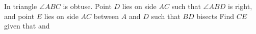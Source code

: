 In triangle  $\angle ABC$ is obtuse.  Point $D$ lies on side $AC$ such that $\angle ABD$ is right, and point $E$ lies on side $AC$ between $A$ and $D$ such that $BD$ bisects   Find $CE$ given that   and 